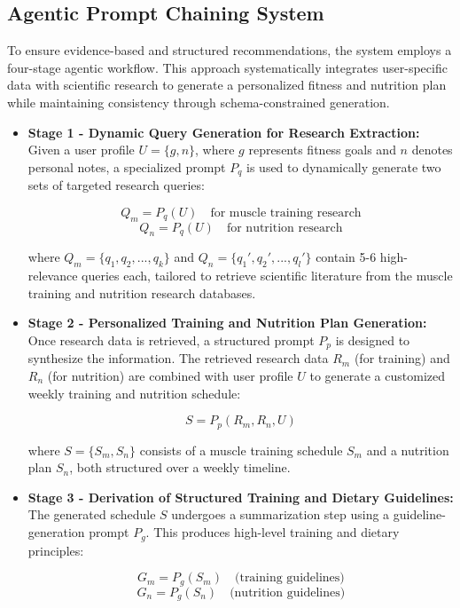 \documentclass[conference]{IEEEtran}
\begin{document}
\subsection{Agentic Prompt Chaining System}
To ensure evidence-based and structured recommendations, the system employs a four-stage agentic workflow. This approach systematically integrates user-specific data with scientific research to generate a personalized fitness and nutrition plan while maintaining consistency through schema-constrained generation.

\begin{itemize}
    \item \textbf{Stage 1 - Dynamic Query Generation for Research Extraction:}  
    Given a user profile $U = \{g, n\}$, where $g$ represents fitness goals and $n$ denotes personal notes, a specialized prompt $P_q$ is used to dynamically generate two sets of targeted research queries:
    
    \[
    Q_m = P_q(U) \quad \text{for muscle training research}
    \]
    \[
    Q_n = P_q(U) \quad \text{for nutrition research}
    \]
    
    where $Q_m = \{q_1, q_2, ..., q_k\}$ and $Q_n = \{q_1', q_2', ..., q_l'\}$ contain 5-6 high-relevance queries each, tailored to retrieve scientific literature from the muscle training and nutrition research databases.

    \item \textbf{Stage 2 - Personalized Training and Nutrition Plan Generation:}  
    Once research data is retrieved, a structured prompt $P_p$ is designed to synthesize the information. The retrieved research data $R_m$ (for training) and $R_n$ (for nutrition) are combined with user profile $U$ to generate a customized weekly training and nutrition schedule:

    \[
    S = P_p(R_m, R_n, U)
    \]

    where $S = \{S_m, S_n\}$ consists of a muscle training schedule $S_m$ and a nutrition plan $S_n$, both structured over a weekly timeline.

    \item \textbf{Stage 3 - Derivation of Structured Training and Dietary Guidelines:}  
    The generated schedule $S$ undergoes a summarization step using a guideline-generation prompt $P_g$. This produces high-level training and dietary principles:

    \[
    G_m = P_g(S_m) \quad \text{(training guidelines)}
    \]
    \[
    G_n = P_g(S_n) \quad \text{(nutrition guidelines)}
    \]


\end{itemize}
\end{document}
